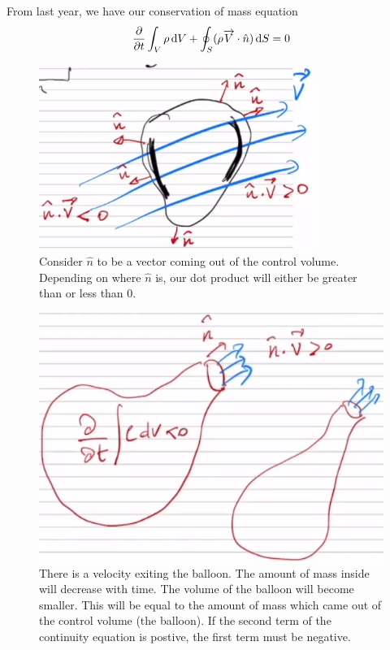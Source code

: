 \documentclass[class=report, crop=false, 12pt,a4paper]{standalone}
\begin{document}
From last year, we have our conservation of mass equation
$$\frac{\partial}{\partial t} \int_V \rho \dif V + \oint_S (\rho \overrightarrow{V} \cdot \hat{n} )\dif S = 0$$
\begin{figure}
  \centering
  \includegraphics[width = 0.8\textwidth]{../img/euleriancontrolvolume.png}
  \caption{Consider $\hat{n}$ to be a vector coming out of the control volume. Depending on where $\hat{n}$ is, our dot product will either be greater than or less than 0.}
\end{figure}
\begin{figure}
  \centering
  \includegraphics[width = 0.8 \textwidth]{../img/balloondeflatingeg.png}
  \caption{There is a velocity exiting the balloon. The amount of mass inside will decrease with time. The volume of the balloon will become smaller. This will be equal to the amount of mass which came out of the control volume (the balloon). If the second term of the continuity equation is postive, the first term must be negative.}
\end{figure}
\end{document}
